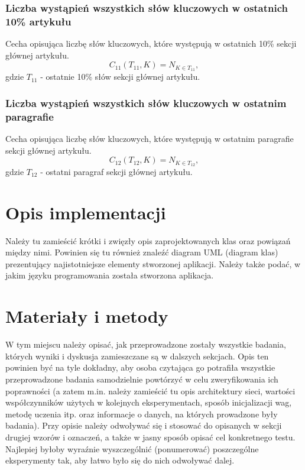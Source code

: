 \documentclass{classrep}
\begin{document}
\subsubsection{Liczba wystąpień wszystkich słów kluczowych w ostatnich 10\% artykułu}
Cecha opisująca liczbę słów kluczowych, które występują w ostatnich 10\% sekcji głównej artykułu.
\begin{equation}
            C_{11}(T_{11},K) = N_{K \in T_{11}},
 \end{equation}	
 gdzie $T_{11}$ - ostatnie 10\% słów sekcji głównej artykułu.

\subsubsection{Liczba wystąpień wszystkich słów kluczowych w ostatnim paragrafie}
Cecha opisująca liczbę słów kluczowych, które występują w ostatnim paragrafie sekcji głównej artykułu.
\begin{equation}
            C_{12}(T_{12},K) = N_{K \in T_{12}},
 \end{equation}	
 gdzie $T_{12}$ - ostatni paragraf sekcji głównej artykułu.


\section{Opis implementacji}
{\color{blue}
Należy tu zamieścić krótki i zwięzły opis zaprojektowanych klas oraz powiązań
między nimi. Powinien się tu również znaleźć diagram UML  (diagram klas)
prezentujący najistotniejsze elementy stworzonej aplikacji. Należy także
podać, w jakim języku programowania została stworzona aplikacja. }

\section{Materiały i metody}
{\color{blue}
W tym miejscu należy opisać, jak przeprowadzone zostały wszystkie badania,
których wyniki i dyskusja zamieszczane są w dalszych sekcjach. Opis ten
powinien być na tyle dokładny, aby osoba czytająca go potrafiła wszystkie
przeprowadzone badania samodzielnie powtórzyć w celu zweryfikowania ich
poprawności (a zatem m.in. należy zamieścić tu opis architektury sieci,
wartości współczynników użytych w kolejnych eksperymentach, sposób
inicjalizacji wag, metodę uczenia itp. oraz informacje o danych, na których
prowadzone były badania). Przy opisie należy odwoływać się i stosować do
opisanych w sekcji drugiej wzorów i oznaczeń, a także w jasny sposób opisać
cel konkretnego testu. Najlepiej byłoby wyraźnie wyszczególnić (ponumerować)
poszczególne eksperymenty tak, aby łatwo było się do nich odwoływać dalej.}
\end{document}
